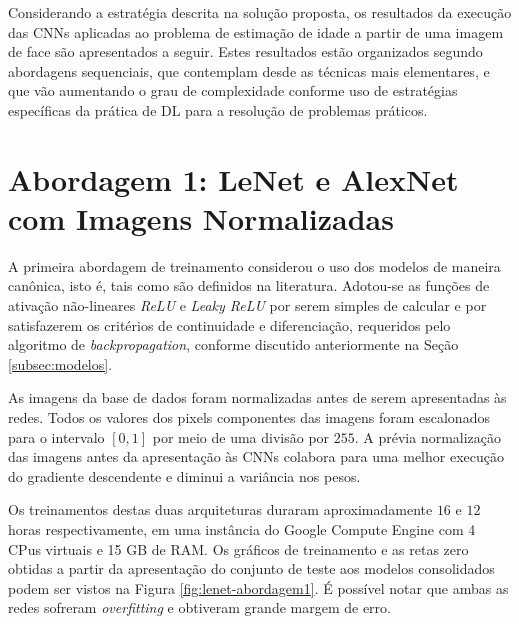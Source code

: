 
Considerando a estratégia descrita na solução proposta, os resultados da execução das CNNs aplicadas ao problema de estimação de idade a partir de uma imagem de face são apresentados a seguir. Estes resultados estão organizados segundo abordagens sequenciais, que contemplam desde as técnicas mais elementares, e que vão aumentando o grau de complexidade conforme uso de estratégias específicas da prática de DL para a resolução de problemas práticos.

\section{Abordagem 1: LeNet e AlexNet com Imagens Normalizadas}%

	A primeira abordagem de treinamento considerou o uso dos modelos de maneira canônica, isto é, tais como são definidos na literatura. Adotou-se as funções de ativação não-lineares \emph{ReLU} e \emph{Leaky ReLU} por serem simples de calcular e por satisfazerem os critérios de continuidade e diferenciação, requeridos pelo algoritmo de \emph{backpropagation}, conforme discutido anteriormente na Seção \ref{subsec:modelos}.

	As imagens da base de dados foram normalizadas antes de serem apresentadas às redes. Todos os valores dos pixels componentes das imagens foram escalonados para o intervalo $[0,1]$ por meio de uma divisão por $255$. A prévia normalização das imagens antes da apresentação às CNNs colabora para uma melhor execução do gradiente descendente e diminui a variância nos pesos.

	Os treinamentos destas duas arquiteturas duraram aproximadamente $16$ e $12$ horas respectivamente, em uma instância do Google Compute Engine com 4 CPus virtuais e 15 GB de RAM. Os gráficos de treinamento e as retas zero obtidas a partir da apresentação do conjunto de teste aos modelos consolidados podem ser vistos na Figura \ref{fig:lenet-abordagem1}. É possível notar que ambas as redes sofreram \emph{overfitting} e obtiveram grande margem de erro.

